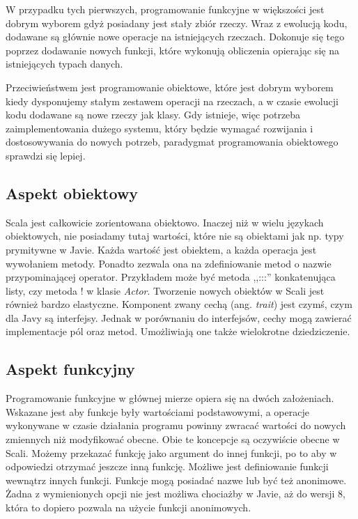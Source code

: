 \documentclass[brudnopis]{xmgr}
\begin{document}
W przypadku tych pierwszych, programowanie funkcyjne w większości jest dobrym wyborem gdyż posiadany jest stały zbiór rzeczy. Wraz z ewolucją kodu, dodawane są głównie nowe operacje na istniejących rzeczach. Dokonuje się tego poprzez dodawanie nowych funkcji, które wykonują obliczenia opierając się na istniejących typach danych. 

Przeciwieństwem jest programowanie obiektowe, które jest dobrym wyborem kiedy dysponujemy stałym zestawem operacji na rzeczach, a w czasie ewolucji kodu dodawane są nowe rzeczy jak klasy. Gdy istnieje, więc potrzeba zaimplementowania dużego systemu, który będzie wymagać rozwijania i dostosowywania do nowych potrzeb, paradygmat programowania obiektowego sprawdzi się lepiej.

\subsection{Aspekt obiektowy}

Scala jest całkowicie zorientowana obiektowo. Inaczej niż w wielu językach obiektowych, nie posiadamy tutaj wartości, które nie są obiektami jak np. typy prymitywne w Javie. Każda wartość jest obiektem, a każda operacja jest wywołaniem metody. Ponadto zezwala ona na zdefiniowanie metod o nazwie przypominającej operator. Przykładem może być metoda ,,:::'' konkatenująca listy, czy metoda ! w klasie \textit{Actor}. Tworzenie nowych obiektów w Scali jest również bardzo elastyczne. Komponent zwany cechą (ang. \emph{trait}) jest czymś, czym dla Javy są interfejsy. Jednak w porównaniu do interfejsów, cechy mogą zawierać implementacje pól oraz metod. Umożliwiają one także wielokrotne dziedziczenie. %

\subsection{Aspekt funkcyjny}

Programowanie funkcyjne w głównej mierze opiera się na dwóch założeniach. Wskazane jest aby funkcje były wartościami podstawowymi, a operacje wykonywane w czasie działania programu powinny zwracać wartości do nowych zmiennych niż modyfikować obecne. Obie te koncepcje są oczywiście obecne w Scali. Możemy przekazać funkcję jako argument do innej funkcji, po to aby w odpowiedzi otrzymać jeszcze inną funkcję. Możliwe jest definiowanie funkcji wewnątrz innych funkcji. Funkcje mogą posiadać nazwe lub być też anonimowe. Żadna z wymienionych opcji nie jest możliwa chociażby w Javie, aż do wersji 8, która to dopiero pozwala na użycie funkcji anonimowych. 
\end{document}
